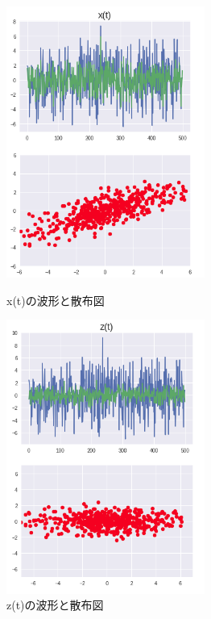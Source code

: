 \begin{figure}[t]
    \begin{minipage}{0.5\hsize}
     \begin{center}
      \includegraphics[width=65mm]{images/x(t).png}
     \end{center}
     \caption{x(t)の波形と散布図}
     \label{fig:x(t)}
    \end{minipage}
    \begin{minipage}{0.5\hsize}
     \begin{center}
      \includegraphics[width=65mm]{images/z(t).png}
     \end{center}
     \caption{z(t)の波形と散布図}
     \label{fig:z(t)}
    \end{minipage}
\end{figure}

